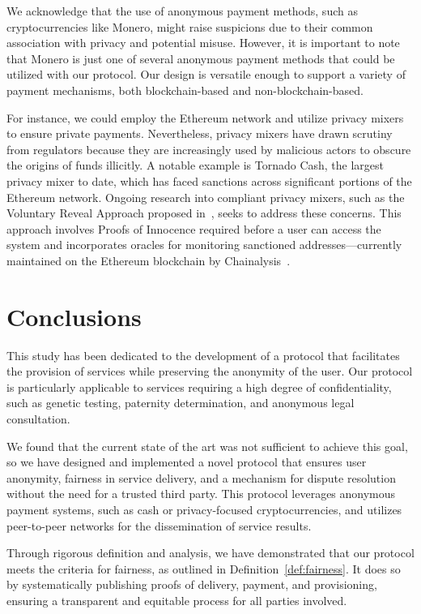 \documentclass[pdftex,twocolumn,epjc3]{svjour3}
\begin{document}
We acknowledge that the use of anonymous payment methods, such as cryptocurrencies like Monero, might raise suspicions due to their common association with privacy and potential misuse. However, it is important to note that Monero is just one of several anonymous payment methods that could be utilized with our protocol. Our design is versatile enough to support a variety of payment mechanisms, both blockchain-based and non-blockchain-based.

\begin{sloppypar}
For instance, we could employ the Ethereum network and utilize privacy mixers to ensure private payments. Nevertheless, privacy mixers have drawn scrutiny from regulators because they are increasingly used by malicious actors to obscure the origins of funds illicitly. A notable example is Tornado Cash, the largest privacy mixer to date, which has faced sanctions across significant portions of the Ethereum network. Ongoing research into compliant privacy mixers, such as the Voluntary Reveal Approach proposed in~\cite{dotanHazeCompliantPrivacy2023}, seeks to address these concerns. This approach involves Proofs of Innocence required before a user can access the system and incorporates oracles for monitoring sanctioned addresses—currently maintained on the Ethereum blockchain by Chainalysis~\cite{ChainalysisOracleSanctions}.
\end{sloppypar}

\section{Conclusions}\label{sec:conclusion}

This study has been dedicated to the development of a protocol that facilitates the provision of services while preserving the anonymity of the user. Our protocol is particularly applicable to services requiring a high degree of confidentiality, such as genetic testing, paternity determination, and anonymous legal consultation.

We found that the current state of the art was not sufficient to achieve this goal, so we have designed and implemented a novel protocol that ensures user anonymity, fairness in service delivery, and a mechanism for dispute resolution without the need for a trusted third party. This protocol leverages anonymous payment systems, such as cash or privacy-focused cryptocurrencies, and utilizes peer-to-peer networks for the dissemination of service results.

\begin{sloppypar}
Through rigorous definition and analysis, we have demonstrated that our protocol meets the criteria for fairness, as outlined in Definition~\ref{def:fairness}. It does so by systematically publishing proofs of delivery, payment, and provisioning, ensuring a transparent and equitable process for all parties involved.
\end{sloppypar}
\end{document}
